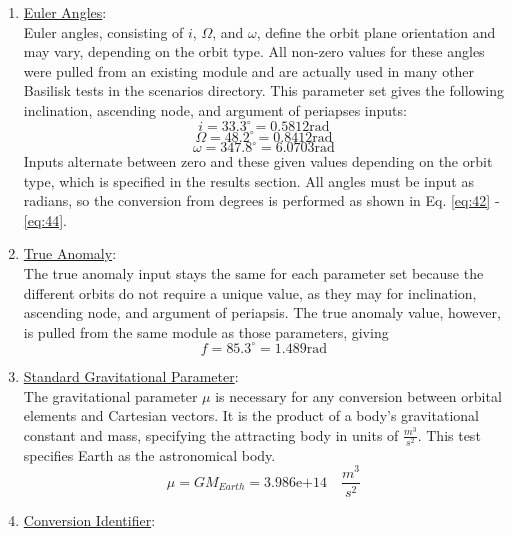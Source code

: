 \begin{enumerate}
	\item \underline{Euler Angles}:\\
	Euler angles, consisting of $i$, $\Omega$, and $\omega$, define the orbit plane orientation and may vary, depending on the orbit type. All non-zero values for these angles were pulled from an existing module and are actually used in many other Basilisk tests in the scenarios directory. This parameter set gives the following inclination, ascending node, and argument of periapses inputs:
	\begin{equation}\label{eq:42}
		i = 33.3^{\circ} = 0.5812 \text{rad}
	\end{equation}
	\begin{equation}\label{eq:43}
		\Omega = 48.2^{\circ} = 0.8412 \text{rad}
	\end{equation}
	\begin{equation}\label{eq:44}
		\omega = 347.8^{\circ} = 6.0703 \text{rad}
	\end{equation}
	Inputs alternate between zero and these given values depending on the orbit type, which is specified in the results section. All angles must be input as radians, so the conversion from degrees is performed as shown in Eq. \ref{eq:42} - \ref{eq:44}.
	\item \underline{True Anomaly}:\\
	The true anomaly input stays the same for each parameter set because the different orbits do not require a unique value, as they may for inclination, ascending node, and argument of periapsis. The true anomaly value, however, is pulled from the same module as those parameters, giving 
	\begin{equation} \label{eq:41}
		f = 85.3^\circ = 1.489 \text{rad}
	\end{equation}
	\item \underline{Standard Gravitational Parameter}:\\
	The gravitational parameter $\mu$ is necessary for any conversion between orbital elements and Cartesian vectors. It is the product of a body's gravitational constant and mass, specifying the attracting body in units of $\frac{m^3}{s^2}$. This test specifies Earth as the astronomical body.
	\begin{equation}
		\mu = GM_{Earth}=3.986 \text{e+} 14\quad \frac{m^3}{s^2}
	\end{equation}
	\item \underline{Conversion Identifier}:\\

\end{enumerate}
